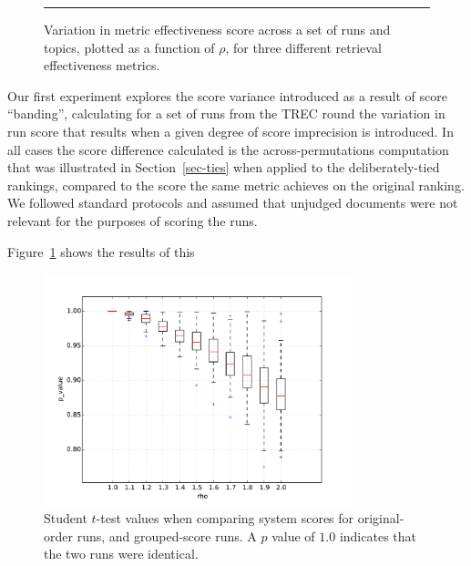 \begin{figure}[t]
\centering
\rule{0.5mm}{45mm}
\caption{Variation in metric effectiveness score across a set of
{} runs and {} topics, plotted as a function of
$\rho$, for three different retrieval effectiveness metrics.
{}
{}
{}
\label{fig-scorevariation}}
\end{figure}

Our first experiment explores the score variance introduced as a
result of score ``banding'', calculating for a set of runs
from the {} TREC round the variation in run score
that results when a given degree of score imprecision is introduced.
In all cases the score difference calculated is the
across-permutations computation that was illustrated in
Section~\ref{sec-ties} when applied to the deliberately-tied
rankings, compared to the score the same metric achieves on the
original ranking.
We followed standard protocols and assumed that unjudged documents
were not relevant for the purposes of scoring the runs.

Figure~\ref{fig-scorevariation} shows the results of this
{} 

\begin{figure}[t]
\centering
\includegraphics[width=0.8\textwidth]{figs/rho-p-value.pdf}
\caption{Student $t$-test values when comparing system scores for
original-order runs, and grouped-score runs.
A $p$ value of $1.0$ indicates that the two runs were identical.
\label{fig-rho-p-value}}
\end{figure}

